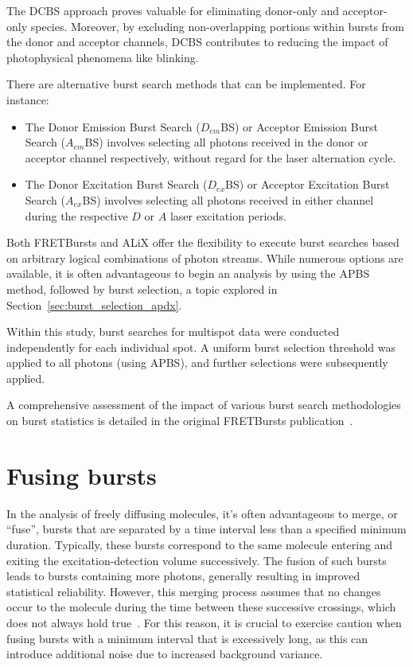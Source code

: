 The \ac{DCBS} approach proves valuable for eliminating donor-only and acceptor-only species. 
Moreover, by excluding non-overlapping portions within bursts from the donor and acceptor channels, \ac{DCBS} contributes to reducing the impact of photophysical phenomena like blinking.

There are alternative burst search methods that can be implemented. 
For instance:

\begin{itemize}
    \item The Donor Emission Burst Search ($D_{em}$BS) or Acceptor Emission Burst Search ($A_{em}$BS) involves selecting all photons received in the donor or acceptor channel respectively, without regard for the laser alternation cycle.
    \item The Donor Excitation Burst Search ($D_{ex}$BS) or Acceptor Excitation Burst Search ($A_{ex}$BS) involves selecting all photons received in either channel during the respective $D$ or $A$ laser excitation periods.
\end{itemize}

Both FRETBursts and ALiX offer the flexibility to execute burst searches based on arbitrary logical combinations of photon streams. While numerous options are available, it is often advantageous to begin an analysis by using the \ac{APBS} method, followed by burst selection, a topic explored in Section~\ref{sec:burst_selection_apdx}.

Within this study, burst searches for multispot data were conducted independently for each individual spot. A uniform burst selection threshold was applied to all photons (using \ac{APBS}), and further selections were subsequently applied.

A comprehensive assessment of the impact of various burst search methodologies on burst statistics is detailed in the original FRETBursts publication~\cite{ingargiola_PLOS1_2016}.

\section{Fusing bursts}
\label{sec:fusing_bursts_apdx}

In the analysis of freely diffusing molecules, it's often advantageous to merge, or \enquote{fuse}, bursts that are separated by a time interval less than a specified minimum duration. 
Typically, these bursts correspond to the same molecule entering and exiting the excitation-detection volume successively. 
The fusion of such bursts leads to bursts containing more photons, generally resulting in improved statistical reliability. 
However, this merging process assumes that no changes occur to the molecule during the time between these successive crossings, which does not always hold true~\cite{hoffmann_PCCP_2011}.
For this reason, it is crucial to exercise caution when fusing bursts with a minimum interval that is excessively long, as this can introduce additional noise due to increased background variance.

